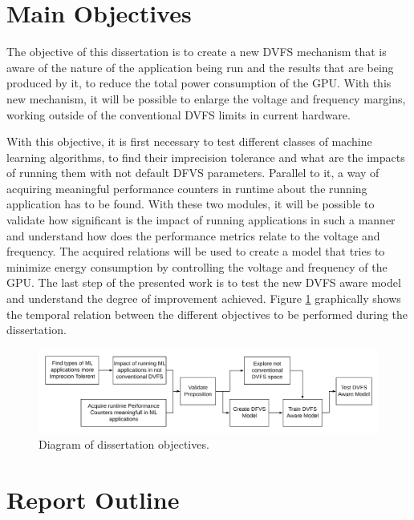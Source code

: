 \section{Main Objectives}
\label{section:objectives}

The objective of this dissertation is to create a new DVFS mechanism that is aware of the nature of the application being run and the results that are being produced by it, to reduce the total power consumption of the GPU. With this new mechanism, it will be possible to enlarge the voltage and frequency margins, working outside of the conventional DVFS limits in current hardware. 

With this objective, it is first necessary to test different classes of machine learning algorithms, to find their imprecision tolerance and what are the impacts of running them with not default DFVS parameters. Parallel to it, a way of acquiring meaningful performance counters in runtime about the running application has to be found. With these two modules, it will be possible to validate how significant is the impact of running applications in such a manner and understand how does the performance metrics relate to the voltage and frequency. The acquired relations will be used to create a model that tries to minimize energy consumption by controlling the voltage and frequency of the GPU. The last step of the presented work is to test the new DVFS aware model and understand the degree of improvement achieved. Figure \ref{fig:thesisObj} graphically shows the temporal relation between the different objectives to be performed during the dissertation.

\begin{figure}[!htb]
  \centering
  \includegraphics[width=1\textwidth]{Figures/Introduction/Dissertation_Objectives.png}
  \caption{Diagram of dissertation objectives.}
  \label{fig:thesisObj}
\end{figure}

\section{Report Outline}